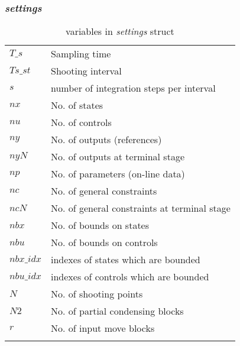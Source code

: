 \documentclass{article}
\newcommand{\alert}[1]{{\textit{#1}}}
\begin{document}
\subsubsection{\alert{settings}}
\begin{longtable}{l|l}
			\hline
			$T\_s$ & Sampling time                                \\
			$Ts\_st$ & Shooting interval                            \\
			$s$ & number of integration steps per interval     \\
			$nx$ & No. of states                                \\
			$nu$ & No. of controls                              \\
			$ny$ & No. of outputs (references)                  \\
			$nyN$ & No. of outputs at terminal stage             \\
			$np$ & No. of parameters (on-line data)             \\
			$nc$ & No. of general constraints                   \\
			$ncN$ & No. of general constraints at terminal stage \\
			$nbx$ & No. of bounds on states                      \\
			$nbu$ & No. of bounds on controls                    \\
			$nbx\_idx$ & indexes of states which are bounded          \\
			$nbu\_idx$ & indexes of controls which are bounded        \\
			$N$ & No. of shooting points                       \\
			$N2$ & No. of partial condensing blocks             \\
			$r$ & No. of input move blocks                     \\ \hline
	\caption{variables in \alert{settings} struct}
	\label{table:settings}
\end{longtable}
\end{document}
